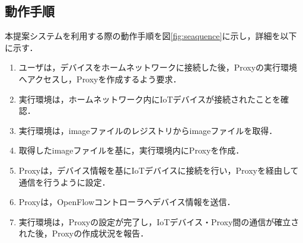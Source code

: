 \documentclass[Japanese]{dicomopapers}
\begin{document}
\subsection{動作手順}
本提案システムを利用する際の動作手順を図\ref{fig:seaquence}に示し，詳細を以下に示す．
\begin{enumerate}
	\item ユーザは，デバイスをホームネットワークに接続した後，Proxyの実行環境へアクセスし，Proxyを作成するよう要求．
	\item 実行環境は，ホームネットワーク内にIoTデバイスが接続されたことを確認．
	\item 実行環境は，imageファイルのレジストリからimageファイルを取得．
	\item 取得したimageファイルを基に，実行環境内にProxyを作成．
	\item Proxyは，デバイス情報を基にIoTデバイスに接続を行い，Proxyを経由して通信を行うように設定．
	\item Proxyは，OpenFlowコントローラへデバイス情報を送信．
	\item 実行環境は，Proxyの設定が完了し，IoTデバイス・Proxy間の通信が確立された後，Proxyの作成状況を報告．
\end{enumerate}



\end{document}
